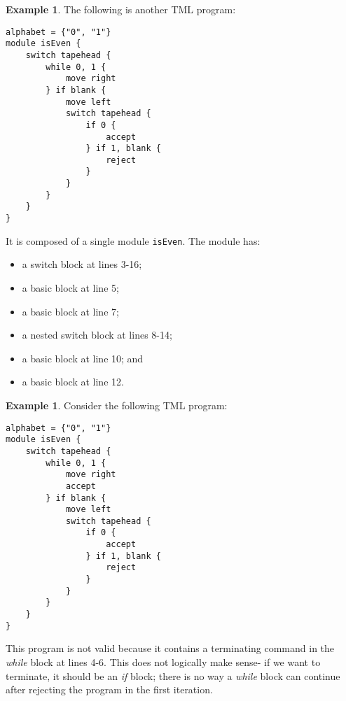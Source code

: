 \documentclass{article}
\theoremstyle{definition}
\newtheorem{example}[rules]{Example}
\theoremstyle{plain}
\begin{document}
    \begin{example}
        The following is another TML program:
\begin{lstlisting}[language=TML]
alphabet = {"0", "1"}
module isEven {
    switch tapehead {
        while 0, 1 {
            move right
        } if blank {
            move left
            switch tapehead {
                if 0 {
                    accept
                } if 1, blank {
                    reject
                }
            }
        }
    }
}
\end{lstlisting}
    It is composed of a single module \texttt{isEven}. The module has:
    \begin{itemize}
        \item a switch block at lines 3-16;
        \item a basic block at line 5;
        \item a basic block at line 7;
        \item a nested switch block at lines 8-14;
        \item a basic block at line 10; and
        \item a basic block at line 12.
    \end{itemize}
    \end{example}
\begin{example}
    Consider the following TML program:
\begin{lstlisting}[language=TML]
alphabet = {"0", "1"}
module isEven {
    switch tapehead {
        while 0, 1 {
            move right
            accept
        } if blank {
            move left
            switch tapehead {
                if 0 {
                    accept
                } if 1, blank {
                    reject
                }
            }
        }
    }
}
\end{lstlisting}
    This program is not valid because it contains a terminating command in the \textit{while} block at lines 4-6. This does not logically make sense- if we want to terminate, it should be an \textit{if} block; there is no way a \textit{while} block can continue after rejecting the program in the first iteration.
    \end{example}
\end{document}
